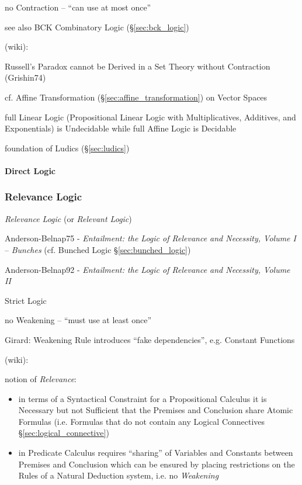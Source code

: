 no Contraction -- ``can use at most once''

\fist see also BCK Combinatory Logic (\S\ref{sec:bck_logic})

(wiki):

Russell's Paradox cannot be Derived in a Set Theory without
Contraction (Grishin74)

cf. Affine Transformation (\S\ref{sec:affine_transformation}) on
Vector Spaces

full Linear Logic (Propositional Linear Logic with Multiplicatives,
Additives, and Exponentials) is Undecidable while full Affine Logic is
Decidable

foundation of Ludics (\S\ref{sec:ludics})



\paragraph{Direct Logic}\label{sec:direct_logic}\hfill



\subsubsection{Relevance Logic}\label{sec:relevance_logic}

\emph{Relevance Logic} (or \emph{Relevant Logic})

Anderson-Belnap75 - \emph{Entailment: the Logic of Relevance and
  Necessity, Volume I} -- \emph{Bunches} (cf. Bunched Logic
\S\ref{sec:bunched_logic})

Anderson-Belnap92 - \emph{Entailment: the Logic of Relevance and
  Necessity, Volume II}

Strict Logic

no Weakening -- ``must use at least once''

Girard: Weakening Rule introduces ``fake dependencies'', e.g. Constant
Functions

(wiki):

notion of \emph{Relevance}:
\begin{itemize}
  \item in terms of a Syntactical Constraint for a
    Propositional Calculus it is Necessary but not Sufficient that the
    Premises and Conclusion share Atomic Formulas (i.e. Formulas that do
    not contain any Logical Connectives \S\ref{sec:logical_connective})
  \item in Predicate Calculus requires ``sharing'' of Variables and
    Constants between Premises and Conclusion which can be ensured by
    placing restrictions on the Rules of a Natural Deduction system,
    i.e. no \emph{Weakening}
\end{itemize}

